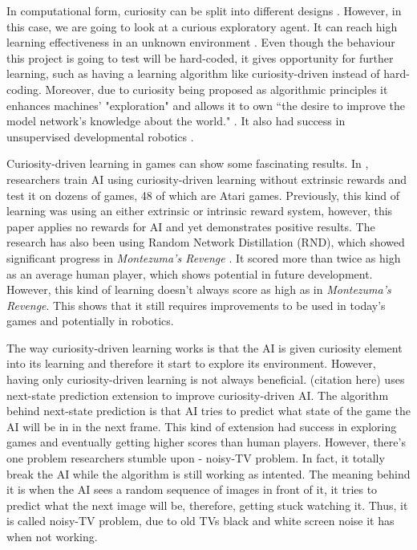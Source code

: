 \documentclass[journal]{IEEEtran}
\begin{document}
In computational form, curiosity can be split into different designs \cite{wu2013curiosity}. However, in this case, we are going to look at a curious exploratory agent. It can reach high learning effectiveness in an unknown environment \cite{wu2013curiosity}\cite{macedo2005role}. Even though the behaviour this project is going to test will be hard-coded, it gives opportunity for further learning, such as having a learning algorithm like curiosity-driven instead of hard-coding. Moreover, due to curiosity being proposed as algorithmic principles \cite{wu2013curiosity}\cite{pang2009curiosity}\cite{karaoguz2011curiosity} it enhances machines' "exploration" and allows it to own ``the desire to improve the model network's knowledge about the world." \cite{schmidhuber1991possibility}. It also had success in unsupervised developmental robotics \cite{schmidhuber2006developmental}\cite{oudeyer2004intelligent}.

Curiosity-driven learning in games can show some fascinating results. In \cite{burda2018large}, researchers train AI using curiosity-driven learning without extrinsic rewards and test it on dozens of games, 48 of which are Atari games. Previously, this kind of learning was using an either extrinsic or intrinsic reward system, however, this paper applies no rewards for AI and yet demonstrates positive results. The research has also been using Random Network Distillation (RND), which showed significant progress in \textit{Montezuma's Revenge} \cite{openairl}\cite{montezumarevenge}. It scored more than twice as high as an average human player, which shows potential in future development. However, this kind of learning doesn't always score as high as in \textit{Montezuma's Revenge}. This shows that it still requires improvements to be used in today's games and potentially in robotics.

The way curiosity-driven learning works is that the AI is given curiosity element into its learning and therefore it start to explore its environment. However, having only curiosity-driven learning is not always beneficial. (citation here) uses next-state prediction extension to improve curiosity-driven AI. The algorithm behind next-state prediction is that AI tries to predict what state of the game the AI will be in in the next frame. This kind of extension had success in exploring games and eventually getting higher scores than human players. However, there's one problem researchers stumble upon - noisy-TV problem. In fact, it totally break the AI while the algorithm is still working as intented. The meaning behind it is when the AI sees a random sequence of images in front of it, it tries to predict what the next image will be, therefore, getting stuck watching it. Thus, it is called noisy-TV problem, due to old TVs black and white screen noise it has when not working.
\end{document}
